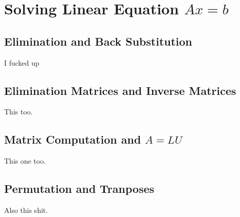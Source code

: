\chapter{Solving Linear Equation \(Ax = b\)}
\section{Elimination and Back Substitution}
I fucked up

\section{Elimination Matrices and Inverse Matrices}
This too.

\section{Matrix Computation and \(A = LU\)}
This one too.

\section{Permutation and Tranposes}
Also this shit.

